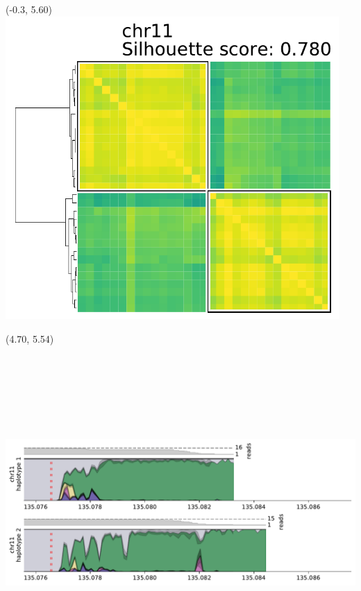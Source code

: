 \documentclass{article}
\begin{document}
\begin{textblock}{13}(-0.3,  5.60) \includegraphics[width=5in]{assets/HG002-q_arm-levenshtein-clustermaps/chr11.pdf}   \end{textblock}
\begin{textblock}{13}(4.70,  5.54) \includegraphics[height=5in]{assets/HG002-q_arm-levenshtein-densityplots/chr11.pdf} \end{textblock}
\end{document}
